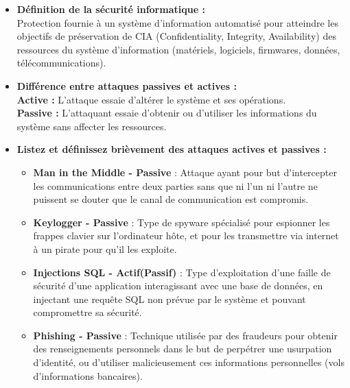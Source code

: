 \documentclass{report}
\begin{document}
			\begin{itemize}

				\item \textbf{Définition de la sécurité informatique : } \\

				Protection fournie à un système d'information automatisé pour atteindre les objectifs de préservation de CIA (Confidentiality, Integrity, Availability) des ressources du système d'information (matériels, logiciels, firmwares, données, télécommunications).\\

				\item \textbf{Différence entre attaques passives et actives : }\\

				\textbf{Active : } L'attaque essaie d'altérer le système et ses opérations.\\
				\textbf{Passive :} L'attaquant essaie d'obtenir ou d'utiliser les informations du système sans affecter les ressources.\\

				\item \textbf{Listez et définissez brièvement des attaques actives et passives :}\\

					\begin{itemize}

						\item \textbf{Man in the Middle - Passive} : Attaque ayant pour but d'intercepter les communications entre deux parties sans que ni l'un ni l'autre ne puissent se douter que le canal de communication est compromis.\\

						\item \textbf{Keylogger - Passive} : Type de spyware spécialisé pour espionner les frappes clavier sur l'ordinateur hôte, et pour les transmettre via internet à un pirate pour qu'il les exploite.\\

						\item \textbf{Injections SQL - Actif(Passif)} : Type d'exploitation d'une faille de sécurité d'une application interagissant avec une base de données, en injectant une requête SQL non prévue par le système et pouvant compromettre sa sécurité.\\

						\item \textbf{Phishing - Passive} : Technique utilisée par des fraudeurs pour obtenir des renseignements personnels dans le but de perpétrer une usurpation d'identité, ou d'utiliser malicieusement ces informations personnelles (vols d'informations bancaires).\\


\end{itemize}
\end{itemize}
\end{document}
